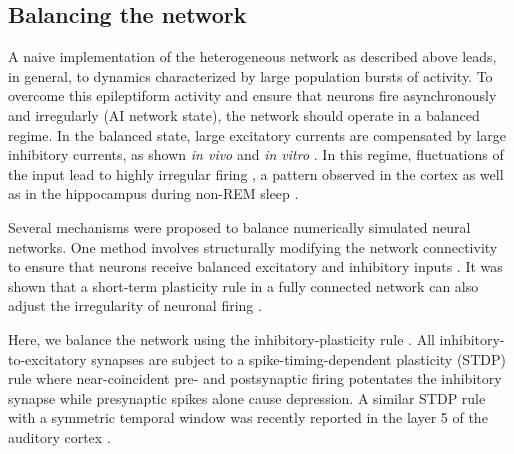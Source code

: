   \subsection{Balancing the network}
    A naive implementation of the heterogeneous network as described above
    leads, in general, to dynamics characterized by large population bursts of
    activity. To overcome this epileptiform activity and ensure that neurons
    fire asynchronously and irregularly (AI network state), the network should
    operate in a balanced regime. In the balanced state, large excitatory
    currents are compensated by large inhibitory currents, as shown \textit{in
    vivo} \citep{Okun2008, Cafaro2010} and \textit{in vitro} \citep{Xue2014}. In
    this regime, fluctuations of the input lead to highly irregular firing
    \citep{vanVreeswijk1996, vanVreeswijk1998}, a pattern observed in the cortex
    \citep{Abeles1991, Softky1993} as well as in the hippocampus during non-REM
    sleep \citep{Csicsvari1999, Poe2010}.
    
    Several mechanisms were proposed to balance numerically simulated neural
    networks. One method involves structurally modifying the network
    connectivity to ensure that neurons receive balanced excitatory and
    inhibitory inputs \citep{Renart2007, Roudi2007}. It was shown that a
    short-term plasticity rule \citep{Tsodyks1997} in a fully connected network
    can also adjust the irregularity of neuronal firing \citep{Barbieri2008}.

    Here, we balance the network using the inhibitory-plasticity rule
    \citep{Vogels2011}. All inhibitory-to-excitatory synapses are subject to a
    spike-timing-dependent plasticity (STDP) rule where near-coincident pre-
    and postsynaptic firing potentates the inhibitory synapse while presynaptic
    spikes alone cause depression. A similar STDP rule with a symmetric
    temporal window was recently reported in the layer 5 of the auditory cortex
    \citep{Damour2015}.

